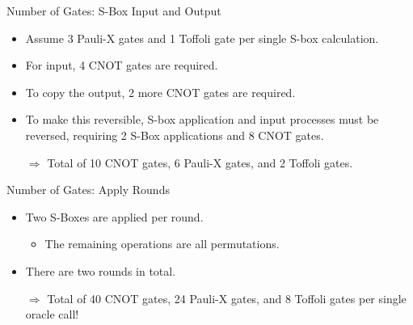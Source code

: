 \documentclass{beamer}
\begin{document}
	\begin{frame}{Number of Gates: S-Box Input and Output}
		\begin{itemize}
			\item Assume 3 Pauli-X gates and 1 Toffoli gate per single S-box calculation.
			\item For input, 4 CNOT gates are required.
			\item To copy the output, 2 more CNOT gates are required.
			\item To make this reversible, S-box application and input processes must be reversed, requiring 2 S-Box applications and 8 CNOT gates.
			\item[$\Rightarrow$] Total of 10 CNOT gates, 6 Pauli-X gates, and 2 Toffoli gates.
		\end{itemize}
	\end{frame}
	
	\begin{frame}{Number of Gates: Apply Rounds}
		\begin{itemize}
			\item Two S-Boxes are applied per round.
			\begin{itemize}
				\item The remaining operations are all permutations.
			\end{itemize}
			\item There are two rounds in total.
			\item[$\Rightarrow$] Total of 40 CNOT gates, 24 Pauli-X gates, and 8 Toffoli gates per single oracle call!
		\end{itemize}
	\end{frame}
\end{document}
